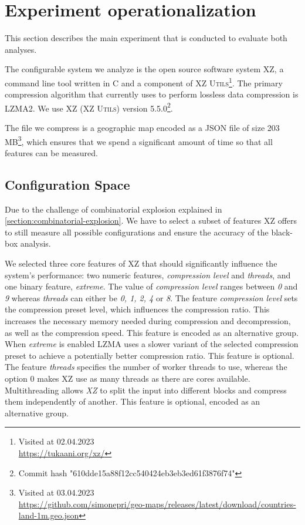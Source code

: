 \section{Experiment operationalization}\label{ch:Research-setup}
This section describes the main experiment that is conducted to evaluate both analyses.

The configurable system we analyze is the open source software system \textsc{XZ}, a command line tool written in \textsc{C} and a component of
\textsc{XZ Utils}\footnote{Visited at 02.04.2023\\ \url{https://tukaani.org/xz/}}.  
The primary compression algorithm that  currently uses to perform lossless data compression is LZMA2.
We use \textsc{XZ} \textsc{(XZ Utils)} version 5.5.0\footnote{Commit hash "610dde15a88f12cc540424eb3eb3ed61f3876f74"}.

The file we compress is a geographic map encoded as a \textsc{JSON} file of size 203 MB\footnote{Visited at 03.04.2023\\ \url{https://github.com/simonepri/geo-maps/releases/latest/download/countries-land-1m.geo.json}},
which ensures that we spend a significant amount of time so that all features can be measured.

\subsection{Configuration Space}
Due to the challenge of combinatorial explosion explained in \autoref{section:combinatorial-explosion}.
We have to select a subset of features \textsc{XZ} offers to still measure all possible configurations and ensure the accuracy of the black-box analysis. 

We selected three core features of \textsc{XZ} that should significantly influence the system's performance: 
two numeric features, \emph{compression level} and \emph{threads}, and one binary feature, \emph{extreme}. 
The value of \emph{compression level} ranges between \emph{0} and \emph{9} whereas \emph{threads} can either be \emph{0, 1, 2, 4} or \emph{8}. 
The feature \emph{compression level} sets the compression preset level, which influences the compression ratio.
This increases the necessary memory needed during compression and decompression, as well as the compression speed. 
This feature is encoded as an alternative group.
When \emph{extreme} is enabled \textsc{LZMA} uses a slower variant of the selected compression preset to achieve a potentially better compression ratio.
This feature is optional.
The feature \emph{threads} specifies the number of worker threads to use, whereas the option $0$ makes \textsc{XZ}  use as many threads as there are cores available.
Multithreading allows \emph{XZ} to split the input into different blocks and compress them independently of another.
This feature is optional, encoded as an alternative group.

